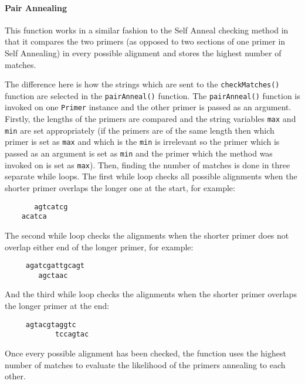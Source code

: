 \paragraph{Pair Annealing}

This function works in a similar fashion to the Self Anneal checking
method in that it compares the two primers (as opposed to two sections
of one primer in Self Annealing) in every possible alignment and stores
the highest number of matches.

The difference here is how the strings which are sent to the
\texttt{checkMatches()} function are selected in the
\texttt{pairAnneal()} function. The \texttt{pairAnneal()} function is
invoked on one \texttt{Primer} instance and the other primer is passed
as an argument. Firstly, the lengths of the primers are compared and the
string variables \texttt{max} and \texttt{min} are set appropriately (if
the primers are of the same length then which primer is set as
\texttt{max} and which is the \texttt{min} is irrelevant so the primer
which is passed as an argument is set as \texttt{min} and the primer
which the method was invoked on is set as \texttt{max}). Then, finding
the number of matches is done in three separate while loops. The first
while loop checks all possible alignments when the shorter primer
overlaps the longer one at the start, for example:
\begin{verbatim}
       agtcatcg
    acatca
\end{verbatim}
The second while loop checks the alignments when the shorter primer does
not overlap either end of the longer primer, for example:
\begin{verbatim}
     agatcgattgcagt
        agctaac
\end{verbatim}
And the third while loop checks the alignments when the shorter primer
overlaps the longer primer at the end:
\begin{verbatim}
     agtacgtaggtc
            tccagtac
\end{verbatim}
Once every possible alignment has been checked, the function uses the
highest number of matches to evaluate the likelihood of the primers
annealing to each other.













